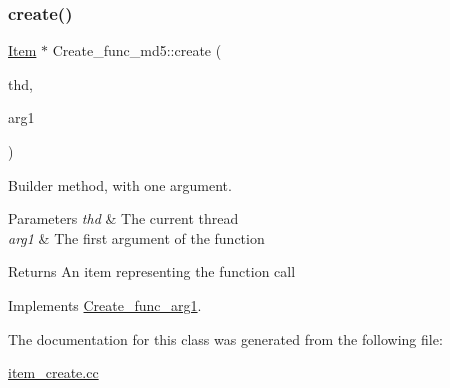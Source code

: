 \subsubsection{\texorpdfstring{create()}{create()}}
{\footnotesize\ttfamily \mbox{\hyperlink{classItem}{Item}} $\ast$ Create\+\_\+func\+\_\+md5\+::create (\begin{DoxyParamCaption}\item[{T\+HD $\ast$}]{thd,  }\item[{\mbox{\hyperlink{classItem}{Item}} $\ast$}]{arg1 }\end{DoxyParamCaption})\hspace{0.3cm}{\ttfamily [virtual]}}

Builder method, with one argument. 
\begin{DoxyParams}{Parameters}
{\em thd} & The current thread \\
\hline
{\em arg1} & The first argument of the function \\
\hline
\end{DoxyParams}
\begin{DoxyReturn}{Returns}
An item representing the function call 
\end{DoxyReturn}


Implements \mbox{\hyperlink{classCreate__func__arg1_a3e9a98f755cd82c3e762e334c955a8c9}{Create\+\_\+func\+\_\+arg1}}.



The documentation for this class was generated from the following file\+:\begin{DoxyCompactItemize}
\item 
\mbox{\hyperlink{item__create_8cc}{item\+\_\+create.\+cc}}\end{DoxyCompactItemize}
